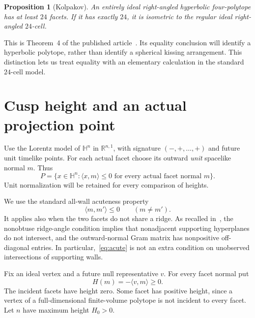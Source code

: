 \documentclass[11pt]{article}
\newtheorem{proposition}[theorem]{Proposition}
\theoremstyle{remark}
\newcommand{\HH}{\mathbb H}
\newcommand{\RR}{\mathbb R}
\newcommand{\ip}[2]{\langle #1,#2\rangle}
\begin{document}
\begin{proposition}[Kolpakov]\label{prop:kolpakov}
An entirely ideal right-angled hyperbolic four-polytope has at least
$24$ facets. If it has exactly $24$, it is isometric to the regular
ideal right-angled $24$-cell.
\end{proposition}

This is Theorem~4 of the published article~\cite[p.~1945]{Kolpakov}.
Its equality conclusion will identify a hyperbolic polytope, rather
than identify a spherical kissing arrangement. This distinction lets
us treat equality with an elementary calculation in the standard
$24$-cell model.

\section{Cusp height and an actual projection point}

Use the Lorentz model of $\HH^n$ in $\RR^{n,1}$, with signature
$(-,+,\ldots,+)$ and future unit timelike points. For each actual
facet choose its outward \emph{unit} spacelike normal $m$. Thus
\[
 P=\{x\in\HH^n:\ip{x}{m}\le0\text{ for every actual facet normal }m\}.
\]
Unit normalization will be retained for every comparison of heights.

We use the standard all-wall acuteness property
\begin{equation}\label{eq:acute}
 \ip{m}{m'}\le0\qquad(m\ne m').
\end{equation}
It applies also when the two facets do not share a ridge. As recalled
in~\cite[p.~42, \S2.1]{Vinberg}, the nonobtuse ridge-angle condition implies
that nonadjacent supporting hyperplanes do not intersect, and the
outward-normal Gram matrix has nonpositive off-diagonal entries.
In particular,~\eqref{eq:acute} is not an extra condition on
unobserved intersections of supporting walls.

Fix an ideal vertex and a future null representative $v$. For every
facet normal put
\begin{equation}\label{eq:height}
 H(m)=-\ip{v}{m}\ge0.
\end{equation}
The incident facets have height zero. Some facet has positive height,
since a vertex of a full-dimensional finite-volume polytope is not
incident to every facet. Let $n$ have maximum height $H_0>0$.
\end{document}

